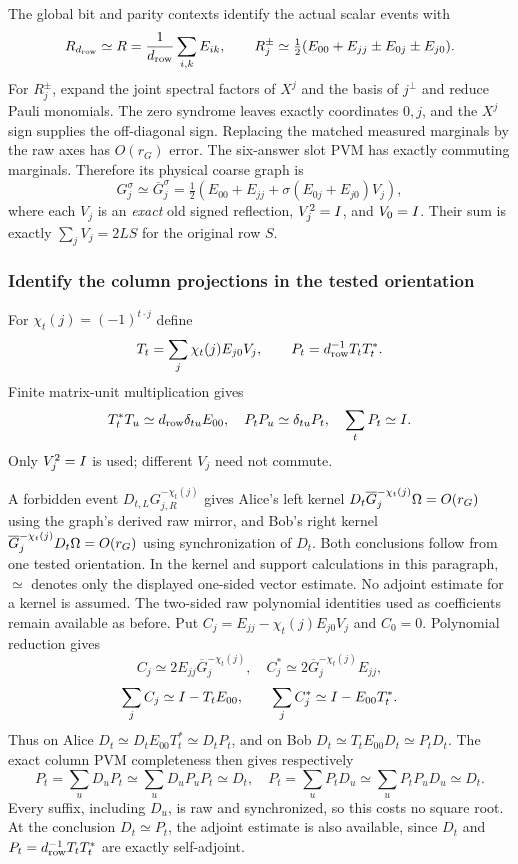 The global bit and parity contexts identify the actual scalar events with
\[
R_{d_{\rm row}}\simeq R=\frac{1}{d_{\rm row}}\sum_{i,k}E_{ik},\qquad
R_j^\pm\simeq\tfrac12(E_{00}+E_{jj}\pm E_{0j}\pm E_{j0}).
\]
For $R_j^\pm$, expand the joint spectral factors of $X^j$ and the basis of $j^\perp$ and reduce Pauli monomials. The zero syndrome leaves exactly coordinates $0,j$, and the $X^j$ sign supplies the off-diagonal sign. Replacing the matched measured marginals by the raw axes has $O(r_G)$ error. The six-answer slot PVM has exactly commuting marginals. Therefore its physical coarse graph is
\[
G_j^\sigma\simeq\overline G_j^\sigma
=\tfrac12(E_{00}+E_{jj}+\sigma(E_{0j}+E_{j0})V_j),
\]
where each $V_j$ is an \emph{exact} old signed reflection, $V_j^2=I$, and $V_0=I$. Their sum is exactly $\sum_jV_j=2LS$ for the original row $S$.

\subsubsection{Identify the column projections in the tested orientation}
For $\chi_t(j)=(-1)^{t\cdot j}$ define
\[
T_t=\sum_j\chi_t(j)E_{j0}V_j,\qquad P_t=d_{\rm row}^{-1}T_tT_t^*.
\]
Finite matrix-unit multiplication gives
\[
T_t^*T_u\simeq d_{\rm row}\delta_{tu}E_{00},\quad
P_tP_u\simeq\delta_{tu}P_t,\quad \sum_tP_t\simeq I.
\]
Only $V_j^2=I$ is used; different $V_j$ need not commute.

A forbidden event $D_{t,L}G_{j,R}^{-\chi_t(j)}$ gives Alice's left kernel
$D_t\overline G_j^{-\chi_t(j)}\Omega=O(r_G)$ using the graph's derived raw mirror, and Bob's right kernel
$\overline G_j^{-\chi_t(j)}D_t\Omega=O(r_G)$ using synchronization of $D_t$. Both conclusions follow from one tested orientation.
In the kernel and support calculations in this paragraph, $\simeq$ denotes only the displayed one-sided vector estimate. No adjoint estimate for a kernel is assumed. The two-sided raw polynomial identities used as coefficients remain available as before.
Put $C_j=E_{jj}-\chi_t(j)E_{j0}V_j$ and $C_0=0$. Polynomial reduction gives
\[
C_j\simeq2E_{jj}\overline G_j^{-\chi_t(j)},\quad
C_j^*\simeq2\overline G_j^{-\chi_t(j)}E_{jj},
\]
\[
\sum_jC_j\simeq I-T_tE_{00},\qquad
\sum_jC_j^*\simeq I-E_{00}T_t^*.
\]
Thus on Alice $D_t\simeq D_tE_{00}T_t^*\simeq D_tP_t$, and on Bob $D_t\simeq T_tE_{00}D_t\simeq P_tD_t$. The exact column PVM completeness then gives respectively
\[
P_t=\sum_uD_uP_t\simeq\sum_uD_uP_uP_t\simeq D_t,
\quad
P_t=\sum_uP_tD_u\simeq\sum_uP_tP_uD_u\simeq D_t.
\]
Every suffix, including $D_u$, is raw and synchronized, so this costs no square root.
At the conclusion $D_t\simeq P_t$, the adjoint estimate is also available, since $D_t$ and $P_t=d_{\rm row}^{-1}T_tT_t^*$ are exactly self-adjoint.

